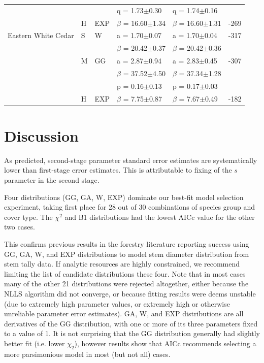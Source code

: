 \message{ !name(pspdistfit_article.tex)}\documentclass{article}
\begin{document}
\begin{table}
{\begin{tabular}{lllllr}
 &  &  & q = 1.73$\pm$0.30 & q = 1.74$\pm$0.16 &  \\
 & H & EXP & $\beta$ = 16.60$\pm$1.34 & $\beta$ = 16.60$\pm$1.31 & -269 \\
Eastern White Cedar & S & W & a = 1.70$\pm$0.07 & a = 1.70$\pm$0.04 & -317 \\
 &  &  & $\beta$ = 20.42$\pm$0.37 & $\beta$ = 20.42$\pm$0.36 &  \\
 & M & GG & a = 2.87$\pm$0.94 & a = 2.83$\pm$0.45 & -307 \\
 &  &  & $\beta$ = 37.52$\pm$4.50 & $\beta$ = 37.34$\pm$1.28 &  \\
 &  &  & p = 0.16$\pm$0.13 & p = 0.17$\pm$0.03 &  \\
 & H & EXP & $\beta$ = 7.75$\pm$0.87 & $\beta$ = 7.67$\pm$0.49 & -182 \\
\bottomrule
\end{tabular}
}%
\end{table}

\section{Discussion}
\label{sec:discussion}

As predicted, second-stage parameter standard error estimates are systematically lower than first-stage error estimates.
This is attributable to fixing of the $s$ parameter in the second stage. 

Four distributions (GG, GA, W, EXP) dominate our best-fit model selection experiment, taking first place for 28 out of 30 combinations of species group and cover type. 
The $\chi^2$ and B1 distributions had the lowest AICc value for the other two cases.

This confirms previous results in the forestry literature reporting success using GG, GA, W, and EXP distributions to model stem diameter distribution from stem tally data.
If analytic resources are highly constrained, we recommend limiting the list of candidate distributions these four.
Note that in most cases many of the other 21 distributions were rejected altogether, either because the NLLS algorithm did not converge, or because fitting results were deems unstable (due to extremely high parameter values, or extremely high or otherwise unreliable parameter error estimates).
GA, W, and EXP distributions are all derivatives of the GG distribution, with one or more of its three parameters fixed to a value of 1. 
It is not surprising that the GG distribution generally had slightly better fit (i.e. lower $\chi_2$), however results show that AICc recommends selecting a more parsimonious model in most (but not all) cases.
\end{document}

